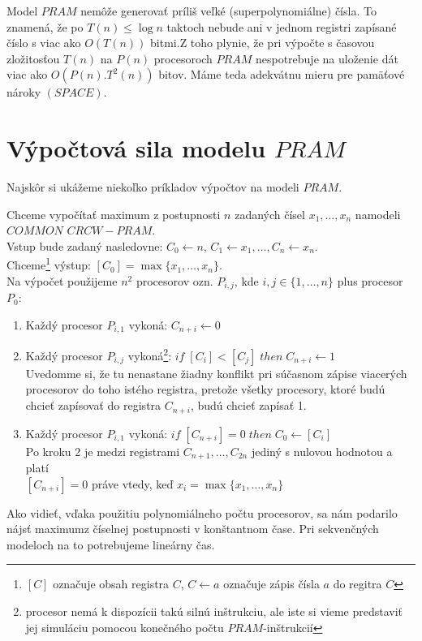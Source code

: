 Model $PRAM$ nemôže generovať príliš veľké (superpolynomiálne)
čísla. To znamená, že po $T(n)\leq \log n$ taktoch nebude ani v
jednom registri zapísané číslo s viac ako $O(T(n))$
bitmi.\linebreak Z toho plynie, že pri výpočte s časovou
zložitosťou $T(n)$ na $P(n)$ procesoroch $PRAM$ nespotrebuje na
uloženie dát viac ako $O(P(n).T^2(n))$ bitov. Máme teda adekvátnu
mieru pre pamäťové nároky $(SPACE)$.

\section{Výpočtová sila modelu $PRAM$}

Najskôr si ukážeme niekoľko príkladov výpočtov na modeli $PRAM$.

\begin{priklad}
Chceme vypočítať maximum z postupnosti $n$ zadaných čísel
$x_1,\dots ,x_n$ na\linebreak modeli $COMMON$ $CRCW-PRAM$.
\\ Vstup bude zadaný nasledovne: $C_0\leftarrow n$, $C_1\leftarrow
x_1,\dots ,C_n\leftarrow x_n$.
\\ Chceme\footnote{$[C]$ označuje obsah registra $C$, $C\leftarrow
a$ označuje zápis čísla $a$ do regitra $C$} výstup: $[C_0]=\max \{
x_1,\dots ,x_n\}$.
\\ Na výpočet použijeme $n^2$ procesorov ozn. $P_{i,j}$, kde
$i,j\in\{ 1,\dots ,n\}$ plus procesor $P_0$:
\begin{enumerate}
  \item Každý procesor $P_{i,1}$ vykoná: $C_{n+i}\leftarrow 0$
  \item Každý procesor $P_{i,j}$ vykoná\footnote{procesor nemá k dispozícii
  takú silnú inštrukciu, ale iste si vieme predstaviť jej simuláciu pomocou konečného
  počtu $PRAM$-inštrukcií}: $if\; [C_i]<[C_j]\; then\; C_{n+i}\leftarrow 1$
  \\ Uvedomme si, že tu nenastane žiadny konflikt pri súčasnom
  zápise viacerých procesorov do toho istého registra, pretože
  všetky procesory, ktoré budú chcieť zapísovať do registra
  $C_{n+i}$, budú chcieť zapísať 1.
  \item Každý procesor $P_{i,1}$ vykoná: $if\; [C_{n+i}]=0\;
  then\; C_0\leftarrow [C_i]$
  \\ Po kroku 2 je medzi registrami $C_{n+1},\dots ,C_{2n}$ jediný
  s nulovou hodnotou a platí
  \\ $[C_{n+i}]=0$ práve vtedy, keď $x_i=\max\{x_1,\dots ,x_n\}$
\end{enumerate}
Ako vidieť, vďaka použitiu polynomiálneho počtu procesorov, sa nám
podarilo nájsť maximum\linebreak z číselnej postupnosti v
konštantnom čase. Pri sekvenčných modeloch na to potrebujeme
lineárny čas.
\end{priklad}

